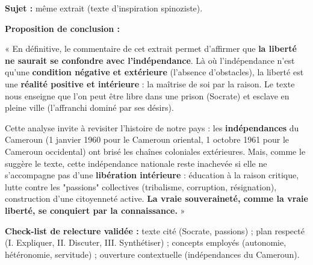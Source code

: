 \documentclass[11pt]{article}
\begin{document}
\begin{exoresolu}
\textbf{Sujet :} même extrait (texte d'inspiration spinoziste).

\tcblower
\textbf{Proposition de conclusion :}

« En définitive, le commentaire de cet extrait permet d'affirmer que \textbf{la liberté ne saurait se confondre avec l'indépendance}. Là où l'indépendance n'est qu'une \textbf{condition négative et extérieure} (l'absence d'obstacles), la liberté est une \textbf{réalité positive et intérieure} : la maîtrise de soi par la raison. Le texte nous enseigne que l'on peut être libre dans une prison (Socrate) et esclave en pleine ville (l'affranchi dominé par ses désirs).

Cette analyse invite à revisiter l'histoire de notre pays : les \textbf{indépendances} du Cameroun (1\ier{} janvier 1960 pour le Cameroun oriental, 1\ier{} octobre 1961 pour le Cameroun occidental) ont brisé les chaînes coloniales extérieures. Mais, comme le suggère le texte, cette indépendance nationale reste inachevée si elle ne s'accompagne pas d'une \textbf{libération intérieure} : éducation à la raison critique, lutte contre les "passions" collectives (tribalisme, corruption, résignation), construction d'une citoyenneté active. \textbf{La vraie souveraineté, comme la vraie liberté, se conquiert par la connaissance.} »

\textbf{Check-list de relecture validée :} texte cité (Socrate, passions) ; plan respecté (I. Expliquer, II. Discuter, III. Synthétiser) ; concepts employés (autonomie, hétéronomie, servitude) ; ouverture contextuelle (indépendances du Cameroun).
\end{exoresolu}
\end{document}
